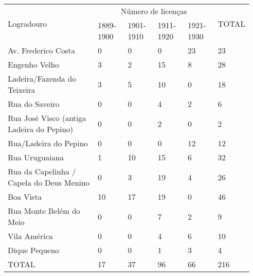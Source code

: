 \begin{table}[!htp]
{
\begin{tiny}
\begin{tabular}{llllll}
\toprule
\multirow{2}{*}{Logradouro}	& \multicolumn{4}{c}{Número de licenças}	& \multirow{2}{*}{TOTAL}\\
\cline{2-5}
	&1889-1900	&1901-1910	&1911-1920	&1921-1930	& \\
\midrule
\midrule
Av. Frederico Costa	&0	&0	&0	&23	&23\\
Engenho Velho	&3	&2	&15	&8	&28\\
Ladeira/Fazenda do Teixeira	&3	&5	&10	&0	&18\\
Rua do Saveiro	&0	&0	&4	&2	&6\\
Rua José Visco (antiga Ladeira do Pepino)	&0	&0	&2	&0	&2\\
Rua/Ladeira do Pepino	&0	&0	&0	&12	&12\\
Rua Uruguaiana	&1	&10	&15	&6	&32\\
Rua da Capelinha / Capela do Deus Menino	&0	&3	&19	&4	&26\\
Boa Vista	&10	&17	&19	&0	&46\\
Rua Monte Belém do Meio	&0	&0	&7	&2	&9\\
Vila América	&0	&0	&4	&6	&10\\
Dique Pequeno	&0	&0	&1	&3	&4\\
\midrule
TOTAL	&17	&37	&96	&66	&216\\
\bottomrule
\end{tabular} 
\end{tiny}
}
{}
\end{table}
